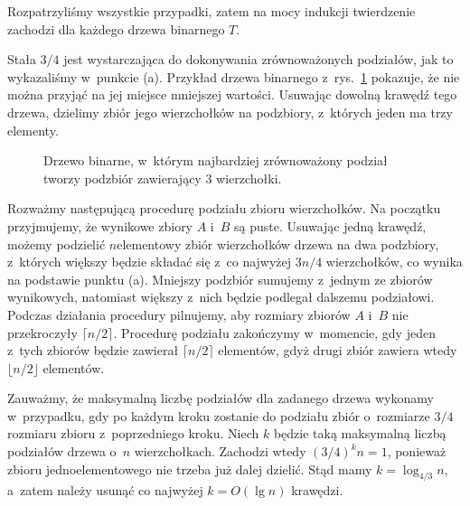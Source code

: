 Rozpatrzyliśmy wszystkie przypadki, zatem na mocy indukcji twierdzenie zachodzi dla każdego drzewa binarnego $T$.

\subproblem %
Stała $3/4$ jest wystarczająca do dokonywania zrównoważonych podziałów, jak to wykazaliśmy w~punkcie (a).
Przykład drzewa binarnego z~rys.\ \ref{fig:B-3b} pokazuje, że nie można przyjąć na jej miejsce mniejszej wartości.
Usuwając dowolną krawędź tego drzewa, dzielimy zbiór jego wierzchołków na podzbiory, z~których jeden ma trzy elementy.
\begin{figure}[!ht]
	\centering 
	\caption{Drzewo binarne, w~którym najbardziej zrównoważony podział tworzy podzbiór zawierający 3 wierzchołki.} \label{fig:B-3b}
\end{figure}

\subproblem %
Rozważmy następującą procedurę podziału zbioru wierzchołków.
Na początku przyjmujemy, że wynikowe zbiory $A$ i~$B$ są puste.
Usuwając jedną krawędź, możemy podzielić $n$\nbhyphen elementowy zbiór wierzchołków drzewa na dwa podzbiory, z~których większy będzie składać się z~co najwyżej $3n/4$ wierzchołków, co wynika na podstawie punktu (a).
Mniejszy podzbiór sumujemy z~jednym ze zbiorów wynikowych, natomiast większy z~nich będzie podlegał dalszemu podziałowi.
Podczas działania procedury pilnujemy, aby rozmiary zbiorów $A$ i~$B$ nie przekroczyły $\lceil n/2\rceil$.
Procedurę podziału zakończymy w~momencie, gdy jeden z~tych zbiorów będzie zawierał $\lceil n/2\rceil$ elementów, gdyż drugi zbiór zawiera wtedy $\lfloor n/2\rfloor$ elementów.

Zauważmy, że maksymalną liczbę podziałów dla zadanego drzewa wykonamy w~przypadku, gdy po każdym kroku zostanie do podziału zbiór o~rozmiarze $3/4$ rozmiaru zbioru z~poprzedniego kroku.
Niech $k$ będzie taką maksymalną liczbą podziałów drzewa o~$n$ wierzchołkach.
Zachodzi wtedy $(3/4)^kn=1$, ponieważ zbioru jednoelementowego nie trzeba już dalej dzielić.
Stąd mamy $k=\log_{4/3}n$, a~zatem należy usunąć co najwyżej $k=O(\lg n)$ krawędzi.
